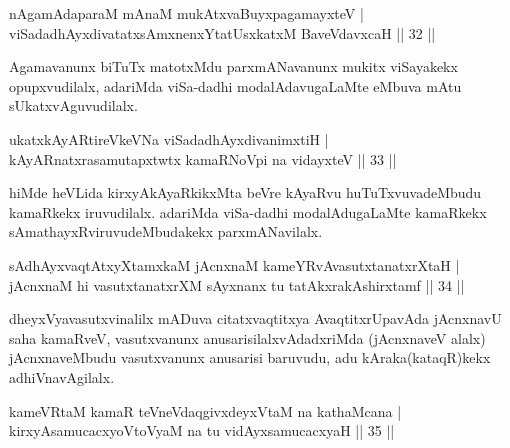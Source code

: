 
\begin{shl}
nA\s \s gamAdaparaM mAnaM mukAtxvaBuyxpagamayxteV |\\
viSadadhAyxdivatatxsAmxnenxYtatUsxkatxM BaveVdavxcaH \hfill || 32 ||
\end{shl}

\begin{artha}
Agamavanunx biTuTx matotxMdu parxmANavanunx mukitx viSayakekx opupxvudilalx, adariMda 
viSa-dadhi modalAdavugaLaMte eMbuva mAtu sUkatxvAguvudilalx.
\end{artha}


\begin{shl}
ukatxkAyARtireVkeVNa viSadadhAyxdivanimxtiH |\\
kAyARnatxrasamutapxtwtx kamaRNoV\s pi na vidayxteV \hfill || 33 ||
\end{shl}

\begin{artha}
hiMde heVLida kirxyAkAyaRkikxMta beVre kAyaRvu huTuTxvuvadeMbudu kamaRkekx iruvudilalx. adariMda viSa-dadhi modalAdugaLaMte kamaRkekx sAmathayxRviruvudeMbudakekx parxmANavilalx.
\end{artha}


\begin{shl}
sAdhAyxvaqtAtxyXtamxkaM jAcnxnaM kameYRvAvasutxtanatxrXtaH |\\
jAcnxnaM hi vasutxtanatxrXM sAyxnanx tu tatAkxrakAshirxtamf \hfill || 34 ||
\end{shl}

\begin{artha}
dheyxVyavasutxvinalilx mADuva citatxvaqtitxya AvaqtitxrUpavAda jAcnxnavU saha kamaRveV, vasutxvanunx anusarisilalxvAdadxriMda (jAcnxnaveV alalx) jAcnxnaveMbudu vasutxvanunx anusarisi baruvudu, adu kAraka(kataqR)kekx adhiVnavAgilalx.
\end{artha}

\begin{shl}
kameVRtaM kamaR teVneVdaqgivxdeyxVtaM na kathaMcana |\\
kirxyAsamucacxyoV\s toV\s yaM na tu vidAyxsamucacxyaH \hfill || 35 ||
\end{shl}

